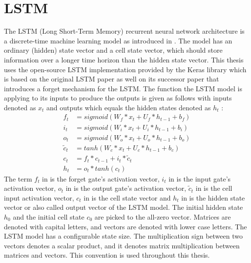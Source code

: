\documentclass[draft,final]{vutinfth} %
\begin{document}
    \section{LSTM} \label{lstm}
    The LSTM (Long Short-Term Memory) recurrent neural network architecture is a discrete-time machine learning model as introduced in .
    The model has an ordinary (hidden) state vector and a cell state vector, which should store information over a longer time horizon than the hidden state vector.
    This thesis uses the open-source LSTM implementation provided by the Keras library \cite{Keras} which is based on the original LSTM paper \cite{LSTM} as well on its successor paper \cite{LSTM_forget} that introduces a forget mechanism for the LSTM.
    The function the LSTM model is applying to its inputs to produce the outputs is given as follows with inputs denoted as $x_t$ and outputs which equals the hidden states denoted as $h_t$ \cite[p. 4-8]{LSTM_forget}:
    \begin{align}
        \label{forget_gate} f_t &= sigmoid(W_f*x_t + U_f*h_{t-1} + b_f) \\
        \label{input_gate} i_t &= sigmoid(W_i*x_t + U_i*h_{t-1} + b_i) \\
        \label{output_gate} o_t &= sigmoid(W_o*x_t + U_o*h_{t-1} + b_o) \\
        \label{cell_input} \tilde{c}_t &= tanh(W_c*x_t + U_c*h_{t-1} + b_c) \\
        \label{cell_state} c_t &= f_t * c_{t-1} + i_t * \tilde{c}_t \\
        \label{hidden_state} h_t &= o_t * tanh(c_t)
    \end{align}
    The term $f_t$ in  is the forget gate's activation vector, $i_t$ in  is the input gate's activation vector, $o_t$ in  is the output gate's activation vector, $\tilde{c}_t$ in  is the cell input activation vector, $c_t$ in  is the cell state vector and $h_t$ in  is the hidden state vector or also called output vector of the LSTM model.
    The initial hidden state $h_0$ and the initial cell state $c_0$ are picked to the all-zero vector.
    Matrices are denoted with capital letters, and vectors are denoted with lower case letters.
    The LSTM model has a configurable state size. The multiplication sign between two vectors denotes a scalar product, and it denotes matrix multiplication between matrices and vectors.
    This convention is used throughout this thesis.
\end{document}

